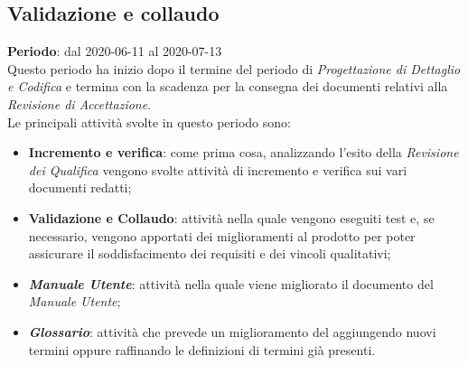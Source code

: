 \subsection{Validazione e collaudo}
\textbf{Periodo}: dal 2020-06-11 al 2020-07-13 \\
Questo periodo ha inizio dopo il termine del periodo di \textit{Progettazione di Dettaglio e Codifica} e termina con la scadenza per la consegna dei documenti relativi alla \textit{Revisione di Accettazione}. \\
Le principali attività svolte in questo periodo sono:
\begin{itemize}
	\item \textbf{Incremento e verifica}: come prima cosa, analizzando l'esito della \textit{Revisione dei Qualifica} vengono svolte attività di incremento e verifica sui vari documenti redatti;
	\item \textbf{Validazione e Collaudo}: attività nella quale vengono eseguiti test e, se necessario, vengono apportati dei miglioramenti al prodotto per poter assicurare il soddisfacimento dei requisiti e dei vincoli qualitativi;
	\item \textbf{\textit{Manuale Utente}}: attività nella quale viene migliorato il documento del \textit{Manuale Utente};
	\item \textbf{\textit{Glossario}}: attività che prevede un miglioramento del \textit{\Glossario{}} aggiungendo nuovi termini oppure raffinando le definizioni di termini già presenti.
\end{itemize}